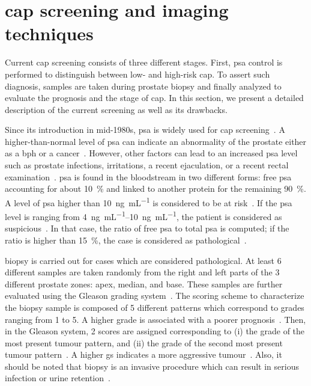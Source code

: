 \section{\acs*{cap} screening and imaging techniques}\label{sec:intro:screening}

Current \ac{cap} screening consists of three different stages.
First, \ac{psa} control is performed to distinguish between low- and high-risk \ac{cap}.
To assert such diagnosis, samples are taken during prostate biopsy and finally analyzed to evaluate the prognosis and the stage of \ac{cap}.
In this section, we present a detailed description of the current screening as well as its drawbacks.

Since its introduction in mid-1980s, \ac{psa} is widely used for \ac{cap} screening~\cite{Etzioni2002}.
A higher-than-normal level of \ac{psa} can indicate an abnormality of the prostate either as a \ac{bph} or a cancer~\cite{Hoeks2011}.
However, other factors can lead to an increased \ac{psa} level such as prostate infections, irritations, a recent ejaculation, or a recent rectal examination~\cite{Parfait2010}.
\ac{psa} is found in the bloodstream in two different forms: free \ac{psa} accounting for about \SI{10}{\percent} and linked to another protein for the remaining \SI{90}{\percent}.
A level of \ac{psa} higher than \SI{10}{\nano\gram\per\milli\liter} is considered to be at risk~\cite{Parfait2010}.
If the \ac{psa} level is ranging from \SIrange{4}{10}{\nano\gram\per\milli\liter}, the patient is considered as suspicious~\cite{Barentsz2012}.
In that case, the ratio of free \ac{psa} to total \ac{psa} is computed; if the ratio is higher than \SI{15}{\percent}, the case is considered as pathological~\cite{Parfait2010}.

 biopsy is carried out for cases which are considered pathological.
At least 6 different samples are taken randomly from the right and left parts of the 3 different prostate zones: apex, median, and base.
These samples are further evaluated using the Gleason grading system~\cite{Gleason1977}.
The scoring scheme to characterize the biopsy sample is composed of 5 different patterns which correspond to grades ranging from 1 to 5.
A higher grade is associated with a poorer prognosis~\cite{Epstein2005}.
Then, in the Gleason system, 2 scores are assigned corresponding to (i) the grade of the most present tumour pattern, and (ii) the grade of the second most present tumour pattern~\cite{Epstein2005}.
A higher \ac{gs} indicates a more aggressive tumour~\cite{Epstein2005}.
Also, it should be noted that biopsy is an invasive procedure which can result in serious infection or urine retention~\cite{Hara2005,Chou2011}.

